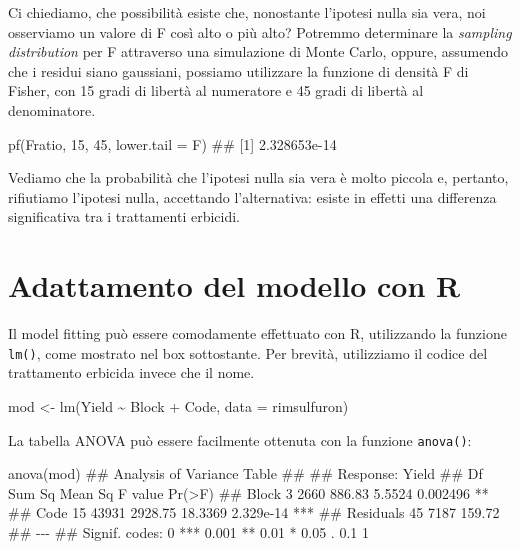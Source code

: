 \documentclass[a4paper,12pt,oneside]{book}
\newenvironment{Shaded}{\begin{snugshade}}{\end{snugshade}}
\newcommand{\DecValTok}[1]{#1}
\newcommand{\SpecialCharTok}[1]{#1}
\newcommand{\DocumentationTok}[1]{#1}
\newcommand{\OtherTok}[1]{#1}
\newcommand{\FunctionTok}[1]{#1}
\newcommand{\AttributeTok}[1]{#1}
\newcommand{\NormalTok}[1]{#1}
\begin{document}
Ci chiediamo, che possibilità esiste che, nonostante l'ipotesi nulla sia vera, noi osserviamo un valore di F così alto o più alto? Potremmo determinare la \emph{sampling distribution} per F attraverso una simulazione di Monte Carlo, oppure, assumendo che i residui siano gaussiani, possiamo utilizzare la funzione di densità F di Fisher, con 15 gradi di libertà al numeratore e 45 gradi di libertà al denominatore.

\begin{Shaded}
\begin{Highlighting}[]
\FunctionTok{pf}\NormalTok{(Fratio, }\DecValTok{15}\NormalTok{, }\DecValTok{45}\NormalTok{, }\AttributeTok{lower.tail =}\NormalTok{ F)}
\DocumentationTok{\#\# [1] 2.328653e{-}14}
\end{Highlighting}
\end{Shaded}

Vediamo che la probabilità che l'ipotesi nulla sia vera è molto piccola e, pertanto, rifiutiamo l'ipotesi nulla, accettando l'alternativa: esiste in effetti una differenza significativa tra i trattamenti erbicidi.

\hypertarget{adattamento-del-modello-con-r}{%
\section{Adattamento del modello con R}\label{adattamento-del-modello-con-r}}

Il model fitting può essere comodamente effettuato con R, utilizzando la funzione \texttt{lm()}, come mostrato nel box sottostante. Per brevità, utilizziamo il codice del trattamento erbicida invece che il nome.

\begin{Shaded}
\begin{Highlighting}[]
\NormalTok{mod }\OtherTok{\textless{}{-}} \FunctionTok{lm}\NormalTok{(Yield }\SpecialCharTok{\textasciitilde{}}\NormalTok{ Block }\SpecialCharTok{+}\NormalTok{ Code, }\AttributeTok{data =}\NormalTok{ rimsulfuron)}
\end{Highlighting}
\end{Shaded}

La tabella ANOVA può essere facilmente ottenuta con la funzione \texttt{anova()}:

\begin{Shaded}
\begin{Highlighting}[]
\FunctionTok{anova}\NormalTok{(mod)}
\DocumentationTok{\#\# Analysis of Variance Table}
\DocumentationTok{\#\# }
\DocumentationTok{\#\# Response: Yield}
\DocumentationTok{\#\#           Df Sum Sq Mean Sq F value    Pr(\textgreater{}F)    }
\DocumentationTok{\#\# Block      3   2660  886.83  5.5524  0.002496 ** }
\DocumentationTok{\#\# Code      15  43931 2928.75 18.3369 2.329e{-}14 ***}
\DocumentationTok{\#\# Residuals 45   7187  159.72                      }
\DocumentationTok{\#\# {-}{-}{-}}
\DocumentationTok{\#\# Signif. codes:  0 \textquotesingle{}***\textquotesingle{} 0.001 \textquotesingle{}**\textquotesingle{} 0.01 \textquotesingle{}*\textquotesingle{} 0.05 \textquotesingle{}.\textquotesingle{} 0.1 \textquotesingle{} \textquotesingle{} 1}
\end{Highlighting}
\end{Shaded}
\end{document}
